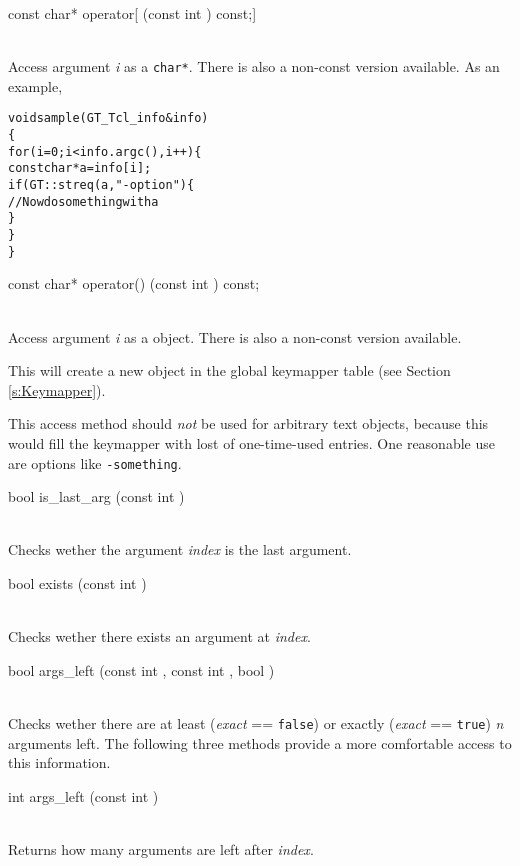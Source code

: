 \documentclass[twoside,fleqn]{report}
\begin{document}
\begin{Cdefinition}
  
  \item[const char* operator[] (const int ) const;]
  \strut\\
  Access argument \emph{i} as a \texttt{char*}. There is also a
  non-const version available. As an example,
\begin{alltt}
void sample (GT_Tcl_info& info)
\{
    for (i=0; i < info.argc(), i++) \{
        const char* a = info[i];
        if (GT::streq (a, "-option") \{
            // Now do something with a
        \}
    \}
\}
\end{alltt}
  
  \item[const char* operator() (const int \Param{i}) const;]
  \strut\\
  Access argument \emph{i} as a  object. There is also a non-const
  version available.

  \begin{notes}
    \item This will create a new object in the global keymapper
    table (see Section \ref{s:Keymapper}).
    \item This access method should \emph{not} be used for
    arbitrary text objects, because this would fill the keymapper
    with lost of one-time-used entries. One reasonable use are
    options like \texttt{-something}.
  \end{notes}

  \item[bool is\_last\_arg (const int \Param{index})]
  \strut\\
  Checks wether the argument \emph{index} is the last argument.
  
  \item[bool exists (const int \Param{index})]
  \strut\\
  Checks wether there exists an argument at \emph{index}.
  
  \item[bool args\_left (const int \Param{index}, const int
  \Param{n}, bool \Param{exact})]
  \strut\\
  Checks wether there are at least (\emph{exact} ==
  \texttt{false}) or exactly (\emph{exact} == \texttt{true})
  \emph{n} arguments left. The following three methods provide a
  more comfortable access to this information.
  
  \item[int args\_left (const int \Param{index})]
  \strut\\
  Returns how many arguments are left after \emph{index}.
  

\end{Cdefinition}
\end{document}
